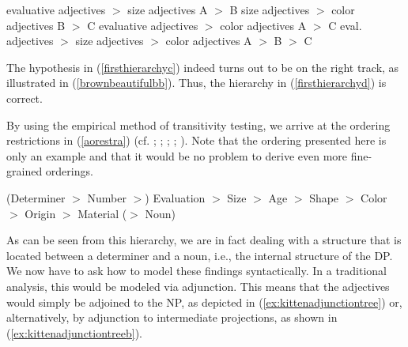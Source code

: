 \begin{exe}
\ex\label{firsthierarchy}\begin{xlist} 
\ex evaluative adjectives $>$ size adjectives \hfill A $>$ B \label{firsthierarchya}
\ex size adjectives $>$ color adjectives \hfill B $>$ C \label{firsthierarchyb} 
\ex evaluative adjectives $>$ color adjectives \hfill A $>$ C \label{firsthierarchyc}
\ex eval. adjectives $>$ size adjectives $>$ color adjectives \hfill A $>$ B $>$ C \label{firsthierarchyd}
\end{xlist}
\end{exe}


\noindent The hypothesis in (\ref{firsthierarchyc}) indeed turns out to be on the right track, as illustrated in (\ref{brownbeautifulbb}). Thus, the hierarchy in (\ref{firsthierarchyd}) is correct.

\begin{exe}
\ex\label{brownbeautifulbb}\begin{xlist} 
\end{xlist}
\end{exe}

\noindent By using the empirical method of transitivity testing, we arrive at the ordering restrictions in (\ref{aorestra}) (cf. \citealt{kingsbury1986longman}; \citealt{sproat1991cross}; \citealt{cinque1994evidence}; \citealt[1304--1308]{hole2015arguments}; \citealt[107--110]{van2017syntax}). Note that the ordering presented here is only an example and that it would be no problem to derive even more fine-grained orderings.

\begin{exe}
\ex\label{aorestra} (Determiner $>$ Number $>$) Evaluation $>$ Size $>$ Age $>$ Shape $>$ Color $>$ Origin $>$ Material ($>$ Noun)
\end{exe}

\noindent As can be seen from this hierarchy, we are in fact dealing with a structure that is located between a determiner and a noun, i.e., the internal structure of the DP. We now have to ask how to model these findings syntactically. In a traditional analysis, this would be modeled via adjunction. This means that the adjectives would simply be adjoined to the NP, as depicted in (\ref{ex:kittenadjunctiontree}) or, alternatively, by adjunction to intermediate projections, as shown in (\ref{ex:kittenadjunctiontreeb}).

